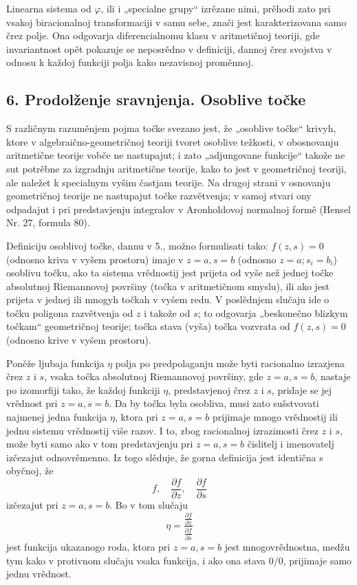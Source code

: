 \documentclass[11pt]{article}
\providecommand{\p}{\partial}
\begin{document}
Linearna sistema od \(\varphi\), ili i „specialne grupy“ izrězane nimi, prěhodi zato pri vsakoj biracionalnoj transformaciji v samu sebe, znači jest karakterizovana samo črez polje. Ona odgovarja diferencialnomu klasu v aritmetičnoj teoriji, gde invariantnost opět pokazuje se neposrědno v definiciji, dannoj črez svojstva v odnosu k každoj funkciji polja kako nezavisnoj proměnnoj.

\subsection*{6. Prodolženje sravnjenja. Osoblive točke}
S različnym razuměnjem pojma točke svezano jest, že „osoblive točke“ krivyh, ktore v algebraično-geometričnoj teoriji tvoret osoblive težkosti, v obosnovanju aritmetične teorije vobče ne nastupajut; i zato „adjungovane funkcije“ takože ne sut potrěbne za izgradnju aritmetične teorije, kako to jest v geometričnoj teoriji, ale naležet k specialnym vyšim častjam teorije. Na drugoj strani v osnovanju geometričnoj teorije ne nastupajut točke razvětvenja; v samoj stvari ony odpadajut i pri predstavjenju integralov v Aronholdovoj normalnoj formě (Hensel Nr. 27, formula 80).

Definiciju osoblivoj točke, dannu v 5., možno formulisati tako: \(f(z,s)=0\) (odnosno kriva v vyšem prostoru) imaje v \(z=a,s=b\) (odnosno \(z=a; s_i=b_i\)) osoblivu točku, ako ta sistema vrědnostij jest prijeta od vyše než jednej točke absolutnoj Riemannovoj površiny (točka v aritmetičnom smyslu), ili ako jest prijeta v jednej ili mnogyh točkah v vyšem redu. V poslědnjem slučaju ide o točku poligona razvětvenja od \(z\) i takože od \(s\); to odgovarja „beskonečno blizkym točkam“ geometričnoj teorije; točka stava (vyša) točka vozvrata od \(f(z,s)=0\) (odnosno krive v vyšem prostoru).

Poněže ljubaja funkcija \(\eta\) polja po predpolaganju može byti racionalno izrazjena črez \(z\) i \(s\), vsaka točka absolutnoj Riemannovoj površiny, gde \(z=a,s=b\), nastaje po izomorfiji tako, že každoj funkciji \(\eta\), predstavjenoj črez \(z\) i \(s\), pridaje se jej vrědnost pri \(z=a,s=b\). Da by točka byla osobliva, musi zato sušstvovati najmenej jedna funkcija \(\eta\), ktora pri \(z=a,s=b\) prijimaje mnogo vrědnostij ili jednu sistemu vrědnostij više razov. I to, zbog racionalnoj izrazimosti črez \(z\) i \(s\), može byti samo ako v tom predstavjenju pri \(z=a,s=b\) čislitelj i imenovatelj izčezajut odnovrěmenno. Iz togo slěduje, že gorna definicija jest identična s obyčnoj, že
\[
f,\quad \frac{\p f}{\p z},\quad \frac{\p f}{\p s}
\]
izčezajut pri \(z=a,s=b\). Bo v tom slučaju
\[
\eta=\frac{\frac{\p f}{\p z}}{\frac{\p f}{\p s}}
\]
jest funkcija ukazanogo roda, ktora pri \(z=a,s=b\) jest mnogovrědnostna, medžu tym kako v protivnom slučaju vsaka funkcija, i ako ona stava \(0/0\), prijimaje samo jednu vrědnost.
\end{document}
